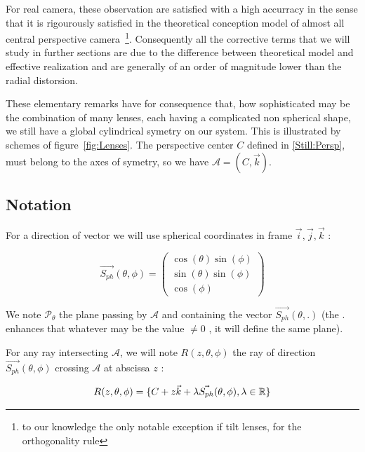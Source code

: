 For real camera, these observation are satisfied with a high accurracy in the sense that it is
rigourously satisfied in the theoretical conception model of almost all central perspective
camera~\footnote{to our knowledge the only notable exception if tilt lenses, for the orthogonality rule}.
Consequently all the corrective terms that we will study in further sections
are due to the difference between theoretical model and effective realization and are
generally of an order of magnitude lower than the radial distorsion.

These elementary remarks have for consequence that, how sophisticated may be the combination
of many lenses, each having a complicated non spherical shape, we still have a global cylindrical
symetry on our system. This is illustrated by schemes of figure~\ref{fig:Lenses}.
The perspective center $C$ defined in \ref{Still:Persp}, must belong to the axes of symetry,
so we have $\mathcal{A}=(C,\vec{k})$. 


\subsection{Notation}

For a direction of vector we will use spherical coordinates in frame $\vec{i},\vec{j},\vec{k}$ :

\begin{equation}
	\vec{S_{ph}}(\theta,\phi)   =\begin{pmatrix}  \cos(\theta) \sin(\phi) \\ \sin(\theta) \sin(\phi)  \\ \cos(\phi) \end{pmatrix}
	     \label{PC:Spher:Coord}
\end{equation}

We  note $\mathcal{P}_{\theta}$  the plane passing by $\mathcal{A}$ and containing the vector    $\vec{S_{ph}}(\theta,.)$
(the $.$ enhances that whatever may be the value $\neq 0$ , it will define the same plane).

For any ray intersecting $\mathcal{A}$, we will note $R(z,\theta,\phi)$ the ray of direction $\vec{S_{ph}}(\theta,\phi)$  crossing $\mathcal{A}$
at abscissa $z$  :

\begin{equation}
	R(z,\theta,\phi) = \{C+ z \vec{k} + \lambda \vec{S_{ph}}(\theta,\phi), \lambda \in \mathbb{R}\}
	     \label{PC:RayParam}
\end{equation}



